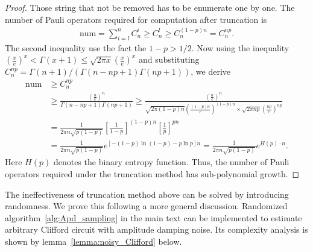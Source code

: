 \documentclass[aps,%
twocolumn,%
floatfix,%
pra,%
amsfonts,%
longbibliography,%
groupedaddress,%
superscriptaddress]{revtex4-2}%
\newcommand{\1}{\mathbbm{1}}
\begin{document}
\begin{proof}
Those string that not be removed has to be enumerate one by one. The number of Pauli operators required for computation after truncation is
\begin{align}
    \text{num} =\sum_{i = l }^n C_n^i \geq C_{n}^{l} \geq C_{n}^{(1-p)n} = C_{n}^{np}.
\end{align}
The second inequality use the fact the $1 - p >1/2$. Now using the inequality $\left(\frac{x}{e}\right)^x < \Gamma(x+1) \leq \sqrt{2\pi x}\left(\frac{x}{e}\right)^x$ and substituting $C_n^{np} = {\Gamma(n+1)}/({\Gamma(n-np+1) \Gamma(np+1)})$, we derive
\begin{align}
\text{num} &\geq C_n^{np} \\
&\geq \frac{(\frac{n}{e})^n}{\Gamma(n - np +1) \Gamma(np+1)} \geq \frac{(\frac{n}{e})^n}{ \sqrt{2\pi (1-p)n}(\frac{(1-p)n}{e})^{(1-p)n}  \times\sqrt{2\pi np}(\frac{np}{e})^{np}} \\
&= \frac{1}{2 \pi n \sqrt{p(1- p)}} \left[\frac{1}{1-p}\right]^{(1-p)n} \left[\frac{1}{p}\right]^{pn}\\
&=\frac{1}{2 \pi n \sqrt{p(1- p)}} e^{\left[-(1-p) \ln (1-p) - p \ln p\right]n} = \frac{1}{2 \pi n \sqrt{p(1- p)}} e^{H(p)\cdot n}.
\end{align}
Here $H(p)$ denotes the binary entropy function. Thus, the number of Pauli operators required under the truncation method has sub-polynomial growth.
\end{proof}
The ineffectiveness of truncation method above can be solved by introducing randomness. We prove this following a more general discussion. Randomized algorithm~\ref{alg:Apd_sampling} in the main text can be implemented to estimate arbitrary Clifford circuit with amplitude damping noise. Its complexity analysis is shown by lemma~\ref{lemma:noisy_Clifford} below.
\end{document}
